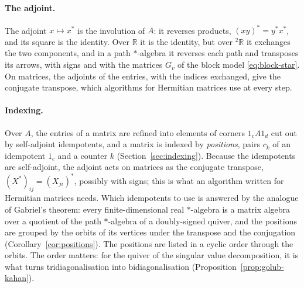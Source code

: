 \documentclass[12pt, a4paper]{report}
\theoremstyle{plain}
\theoremstyle{definition}
\theoremstyle{remark}
\theoremstyle{plain}
\newcommand{\staralg}[0]{$*$-algebra}
\newcommand{\RR}{\mathbb{R}}
\newcommand{\twoR}{{}^{2}\mathbb{R}}
\begin{document}
\paragraph{The adjoint.} The adjoint $x\mapsto x^*$ is the involution of $A$: it reverses products, $(xy)^*=y^*x^*$, and its square is the identity. Over $\RR$ it is the identity, but over $\twoR$ it exchanges the two components, and in a path $*$-algebra it reverses each path and transposes its arrows, with signs and with the matrices $G_v$ of the block model \eqref{eq:block-star}. On matrices, the adjoints of the entries, with the indices exchanged, give the conjugate transpose, which algorithms for Hermitian matrices use at every step.

\paragraph{Indexing.} Over $A$, the entries of a matrix are refined into elements of corners $1_cA1_d$ cut out by self-adjoint idempotents, and a matrix is indexed by \emph{positions}, pairs $c_k$ of an idempotent $1_c$ and a counter $k$ (Section~\ref{sec:indexing}). Because the idempotents are self-adjoint, the adjoint acts on matrices as the conjugate transpose, $(X^*)_{ij}=(X_{ji})^*$, possibly with signs; this is what an algorithm written for Hermitian matrices needs. Which idempotents to use is answered by the analogue of Gabriel's theorem: every finite-dimensional real \staralg{} is a matrix algebra over a quotient of the path $*$-algebra of a doubly-signed quiver, and the positions are grouped by the orbits of its vertices under the transpose and the conjugation (Corollary~\ref{cor:positions}). The positions are listed in a cyclic order through the orbits. The order matters: for the quiver of the singular value decomposition, it is what turns tridiagonalisation into bidiagonalisation (Proposition~\ref{prop:golub-kahan}).
\end{document}
